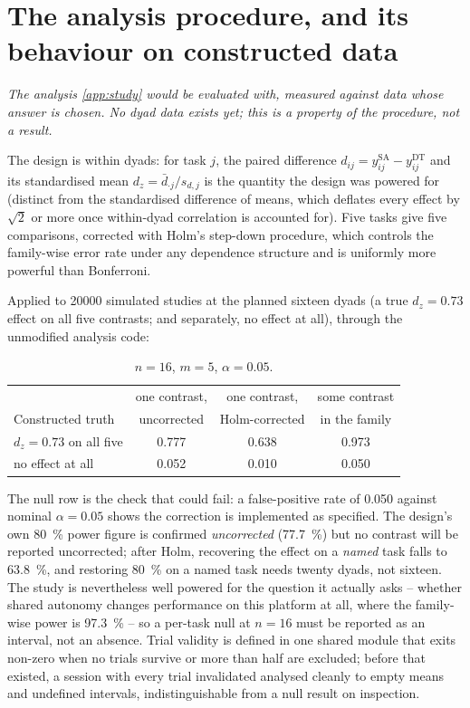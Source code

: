 \chapter{The analysis procedure, and its behaviour on constructed data}
\label{app:analysis}
\label{ch:participant}

\noindent\emph{The analysis \cref{app:study} would be evaluated with,
measured against data whose answer is chosen. No dyad data exists yet; this
is a property of the procedure, not a result.}

The design is within dyads: for task $j$, the paired difference
$d_{ij}=y^{\text{SA}}_{ij}-y^{\text{DT}}_{ij}$ and its standardised mean
$d_z=\bar{d}_{\cdot j}/s_{d,j}$ is the quantity the design was powered for
(distinct from the standardised difference of means, which deflates every
effect by $\sqrt2$ or more once within-dyad correlation is accounted for).
Five tasks give five comparisons, corrected with Holm's step-down procedure,
which controls the family-wise error rate under any dependence structure and
is uniformly more powerful than Bonferroni.

Applied to \num{20000} simulated studies at the planned sixteen dyads (a
true $d_z=0.73$ effect on all five contrasts; and separately, no effect at
all), through the unmodified analysis code:

\begin{table}[htbp]
  \centering
  \caption[The analysis on constructed data]{$n=16$, $m=5$, $\alpha=0.05$.}
  \label{tab:pipeline-validation}
  \begin{tabular}{@{}lccc@{}}
    \toprule
    & one contrast, & one contrast, & some contrast \\
    Constructed truth & uncorrected & Holm-corrected & in the family \\
    \midrule
    $d_z=0.73$ on all five & \num{0.777} & \num{0.638} & \num{0.973} \\
    no effect at all       & \num{0.052} & \num{0.010} & \num{0.050} \\
    \bottomrule
  \end{tabular}
\end{table}

The null row is the check that could fail: a false-positive rate of
\num{0.050} against nominal $\alpha=0.05$ shows the correction is
implemented as specified. The design's own \SI{80}{\percent} power figure is
confirmed \emph{uncorrected} (\SI{77.7}{\percent}) but no contrast will be
reported uncorrected; after Holm, recovering the effect on a \emph{named}
task falls to \SI{63.8}{\percent}, and restoring \SI{80}{\percent} on a named
task needs twenty dyads, not sixteen. The study is nevertheless well powered
for the question it actually asks -- whether shared autonomy changes
performance on this platform at all, where the family-wise power is
\SI{97.3}{\percent} -- so a per-task null at $n=16$ must be reported as an
interval, not an absence. Trial validity is defined in one shared module
that exits non-zero when no trials survive or more than half are excluded;
before that existed, a session with every trial invalidated analysed
cleanly to empty means and undefined intervals, indistinguishable from a
null result on inspection.

